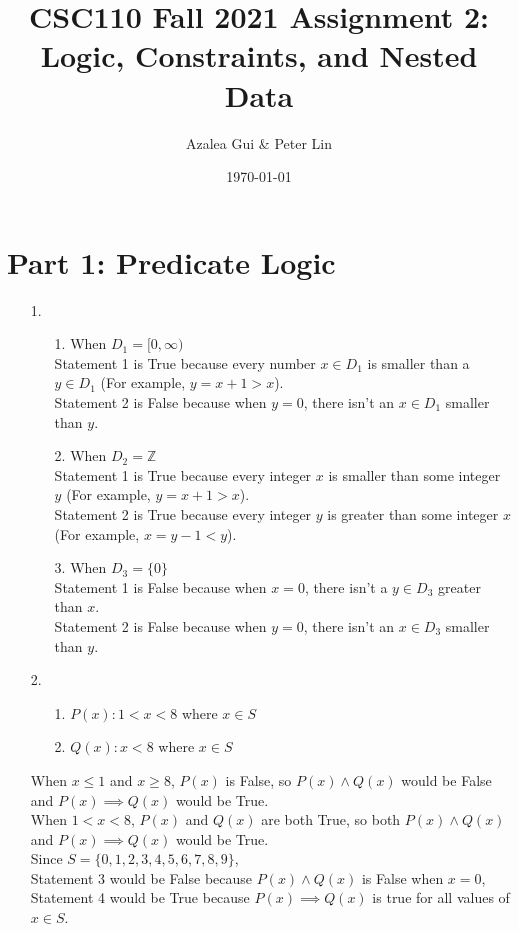 \documentclass[fontsize=11pt]{article}
\title{CSC110 Fall 2021 Assignment 2: Logic, Constraints, and Nested Data}
\author{Azalea Gui & Peter Lin}
\date{\today}
\begin{document}
\maketitle

\section*{Part 1: Predicate Logic}

\begin{enumerate}

\item[1.]
    \begin{enumerate}
        \item[1.] When $D_1 = [0,\infty) $ \\
            Statement 1 is True because every number $x \in D_1$ is smaller than a $y \in D_1$ (For example, $y=x+1>x$). \\
            Statement 2 is False because when $y=0$, there isn't an $x \in D_1$ smaller than $y$. 
        \item[2.] When $D_2 = \mathbb{Z}$ \\
            Statement 1 is True because every integer $x$ is smaller than some integer $y$ (For example, $y=x+1>x$). \\
            Statement 2 is True because every integer $y$ is greater than some integer $x$ (For example, $x=y-1<y$).
        \item[3.] When $D_3 = \{0\}$ \\
            Statement 1 is False because when $x=0$, there isn't a $y \in D_3$ greater than $x$. \\
            Statement 2 is False because when $y=0$, there isn't an $x \in D_3$ smaller than $y$. 
    \end{enumerate}

\item[2.]
    \begin{enumerate}
        \item[1.] $P(x): 1 < x < 8$ where $x \in S$
        \item[2.] $Q(x): x < 8$ where $x \in S$
    \end{enumerate}
    When $x \leq 1$ and $x \geq 8$, $P(x)$ is False, so $P(x) \land Q(x)$ would be False and $P(x) \implies Q(x)$ would be True. \\
    When $1 < x < 8$, $P(x)$ and $Q(x)$ are both True, so both $P(x) \land Q(x)$ and $P(x) \implies Q(x)$ would be True. \\
    Since $S = \{0, 1, 2, 3, 4, 5, 6, 7, 8, 9\}$, \\
    Statement 3 would be False because $P(x) \land Q(x)$ is False when $x=0$, \\ 
    Statement 4 would be True because $P(x) \implies Q(x)$ is true for all values of $x \in S$.


\end{enumerate}
\end{document}
